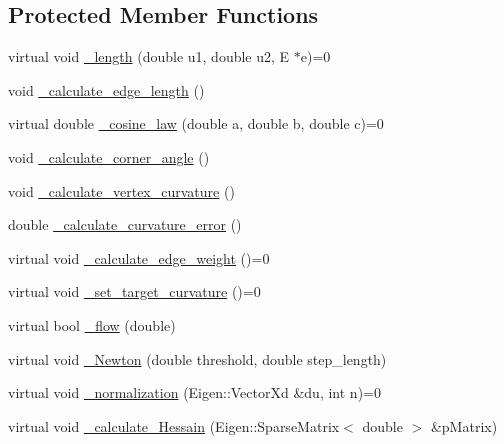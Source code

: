 \subsection*{Protected Member Functions}
\begin{DoxyCompactItemize}
\item 
virtual void \hyperlink{class_mesh_lib_1_1_c_base_ricci_flow_a58804aa74a20e99405feaf6f03f0286f}{\+\_\+length} (double u1, double u2, E $\ast$e)=0
\item 
void \hyperlink{class_mesh_lib_1_1_c_base_ricci_flow_a689bcf5fa1c50880d9073423de566228}{\+\_\+calculate\+\_\+edge\+\_\+length} ()
\item 
virtual double \hyperlink{class_mesh_lib_1_1_c_base_ricci_flow_a56a24ad8c35c165acfdd1adfac92bf25}{\+\_\+cosine\+\_\+law} (double a, double b, double c)=0
\item 
void \hyperlink{class_mesh_lib_1_1_c_base_ricci_flow_a9e8eee26f716ff1eb365abbb8091c61e}{\+\_\+calculate\+\_\+corner\+\_\+angle} ()
\item 
void \hyperlink{class_mesh_lib_1_1_c_base_ricci_flow_aff0772727106e45bc2854ffb51a4902f}{\+\_\+calculate\+\_\+vertex\+\_\+curvature} ()
\item 
double \hyperlink{class_mesh_lib_1_1_c_base_ricci_flow_adad5006c071e951e3f32f4fa6db0db83}{\+\_\+calculate\+\_\+curvature\+\_\+error} ()
\item 
virtual void \hyperlink{class_mesh_lib_1_1_c_base_ricci_flow_abf7685f1b3692a870aea756c4fdfea5c}{\+\_\+calculate\+\_\+edge\+\_\+weight} ()=0
\item 
virtual void \hyperlink{class_mesh_lib_1_1_c_base_ricci_flow_a0c8e62c086e434c38820ceec5592884e}{\+\_\+set\+\_\+target\+\_\+curvature} ()=0
\item 
virtual bool \hyperlink{class_mesh_lib_1_1_c_base_ricci_flow_a760254c91a9b18a7075ace49e6f85ba0}{\+\_\+flow} (double)
\item 
virtual void \hyperlink{class_mesh_lib_1_1_c_base_ricci_flow_ad2ecc7d640197c1ee7d4000f79ce63f8}{\+\_\+\+Newton} (double threshold, double step\+\_\+length)
\item 
virtual void \hyperlink{class_mesh_lib_1_1_c_base_ricci_flow_a65f2670e9693a0afc64d8edd5b1fd90a}{\+\_\+normalization} (Eigen\+::\+Vector\+Xd \&du, int n)=0
\item 
virtual void \hyperlink{class_mesh_lib_1_1_c_base_ricci_flow_af3f5db69f38d5085ccae21929365dda1}{\+\_\+calculate\+\_\+\+Hessain} (Eigen\+::\+Sparse\+Matrix$<$ double $>$ \&p\+Matrix)
\end{DoxyCompactItemize}
